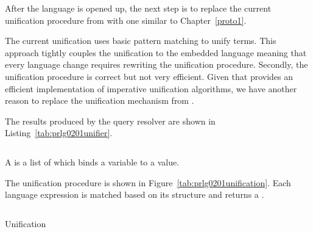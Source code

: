 \documentclass[thesis-solanki.tex]{subfiles}
\begin{document}
After the language is opened up, the next step is to replace the current unification procedure from
 \cite{prolog-lib} with one similar to Chapter~\ref{proto1}.


The current unification uses basic pattern matching to unify terms.
This approach tightly couples the unification to the embedded language meaning that every language change requires
rewriting the unification procedure.
Secondly, the unification procedure is correct but not very efficient.
Given that  \cite{unification-fd-lib} provides an efficient implementation of
imperative unification algorithms, we have another reason to replace the unification mechanism from
 \cite{prolog-lib}.

The results produced by the query resolver are shown in Listing~\ref{tab:prlg0201unifier}.
\begin{code-list}[H]
\begin{singlespace}
\inputminted{haskell}{haskell-proto2-prlg-0201-unifier.hs}
\end{singlespace}
\caption{ }
\label{tab:prlg0201unifier}
\end{code-list}

A  is a list of  which binds a variable to a value.

The unification procedure is shown in Figure~\ref{tab:prlg0201unification}.
Each language expression is matched based on its structure and returns a  .


\begin{code-list}[H]
  \begin{singlespace}
    \inputminted[linenos]{haskell}{haskell-proto2-unification-lion.hs}
  \end{singlespace}
\caption{ Unification}
\label{tab:prlg0201unification}
\end{code-list}

\end{document}
